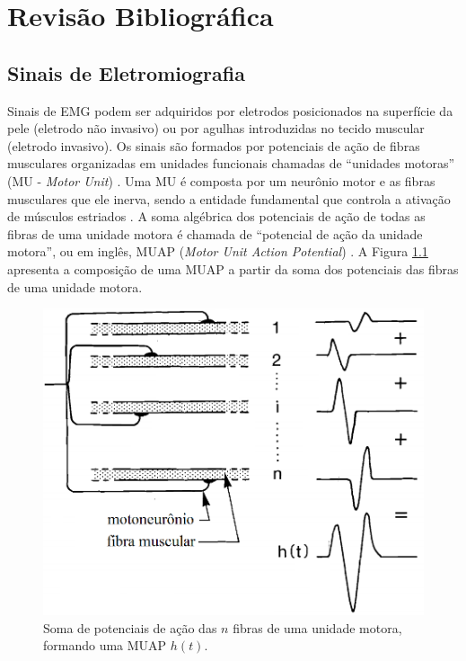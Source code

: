 	\chapter{Revisão Bibliográfica}
		\section{Sinais de Eletromiografia}
Sinais de EMG podem ser adquiridos por eletrodos posicionados na superfície da pele (eletrodo não invasivo) ou por agulhas introduzidas no tecido muscular (eletrodo invasivo). Os sinais são formados por potenciais de ação de fibras musculares organizadas em unidades funcionais chamadas de ``unidades motoras'' (MU - \emph{Motor Unit}) \cite{Luca2006}. Uma MU é composta por um neurônio motor e as fibras musculares que ele inerva, sendo a entidade fundamental que controla a ativação de músculos estriados \cite{Buchthal980}. A soma algébrica dos potenciais de ação de todas as fibras de uma unidade motora é chamada de ``potencial de ação da unidade motora'', ou em inglês, MUAP (\emph{Motor Unit Action Potential}) \cite{Almeida1997}. A Figura \ref{fig_MUAP_comp} apresenta a composição de uma MUAP a partir da soma dos potenciais das fibras de uma unidade motora.

\begin{figure}[htb]
	\caption{\label{fig_MUAP_comp}Soma de potenciais de ação das $n$ fibras de uma unidade motora, formando uma MUAP $h(t)$.}
	\begin{center}
	    \includegraphics[width=0.75\linewidth]{./img/MUAP_oneMU.png}
	\end{center}
\end{figure}

